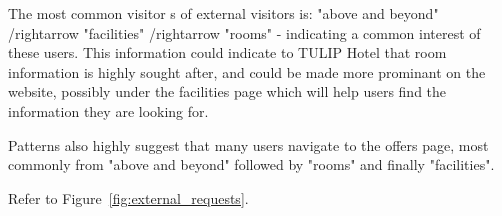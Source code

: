 The most common visitor s of external visitors is: "above and beyond" /rightarrow "facilities" /rightarrow "rooms" - indicating a common interest of these users. This information could indicate to TULIP Hotel that room information is highly sought after, and could be made more prominant on the website, possibly under the facilities page which will help users find the information they are looking for.

Patterns also highly suggest that many users navigate to the offers page, most commonly from "above and beyond" followed by "rooms" and finally "facilities".

Refer to Figure~\ref{fig:external_requests}.

